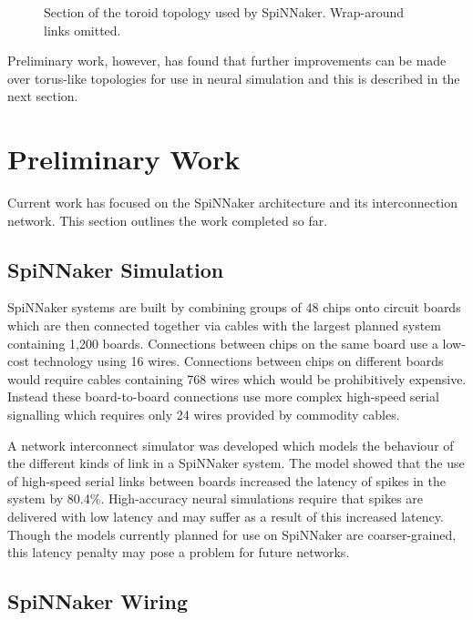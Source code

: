 		\begin{figure}
			\center
			
			\caption{Section of the toroid topology used by SpiNNaker. Wrap-around
			links omitted.}
			\label{fig:toroid}
		\end{figure}
		
		Preliminary work, however, has found that further improvements can be made
		over torus-like topologies for use in neural simulation and this is
		described in the next section.

\section{Preliminary Work}
	
	Current work has focused on the SpiNNaker architecture and its interconnection
	network. This section outlines the work completed so far.
	
	\subsection{SpiNNaker Simulation}
		
		SpiNNaker systems are built by combining groups of 48 chips onto circuit
		boards which are then connected together via cables with the largest planned
		system containing 1,200 boards. Connections between chips on the same board
		use a low-cost technology using 16 wires. Connections between chips on
		different boards would require cables containing 768 wires which would be
		prohibitively expensive. Instead these board-to-board connections use more
		complex high-speed serial signalling which requires only 24 wires provided
		by commodity cables.
		
		A network interconnect simulator was developed which models the behaviour of
		the different kinds of link in a SpiNNaker system. The model showed that the
		use of high-speed serial links between boards increased the latency of
		spikes in the system by 80.4\%. High-accuracy neural simulations require
		that spikes are delivered with low latency and may suffer as a result of
		this increased latency. Though the models currently planned for use on
		SpiNNaker are coarser-grained, this latency penalty may pose a problem for
		future networks.
	
	\subsection{SpiNNaker Wiring}
	
